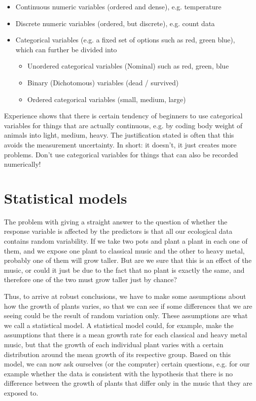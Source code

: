 \documentclass[a4paper,twoside]{tufte-book} %
\begin{document}
\begin{itemize}
\item Continuous numeric variables (ordered and dense), e.g. temperature
\item Discrete numeric variables (ordered, but discrete), e.g. count data
\item Categorical variables (e.g. a fixed set of options such as red, green blue), which can further be divided into
\begin{itemize}
\item Unordered categorical variables (Nominal) such as red, green, blue 
\item Binary (Dichotomous) variables (dead / survived)
\item Ordered categorical variables (small, medium, large)
\end{itemize}
\end{itemize}

Experience shows that there is certain tendency of beginners to use categorical variables for things that are actually continuous, e.g. by coding body weight of animals into light, medium, heavy.  The justification stated is often that this avoids the measurement uncertainty. In short: it doesn't, it just creates more problems. Don't use categorical variables for things that can also be recorded numerically! 


\section{Statistical models}

The problem with giving a straight answer to the question of whether the response variable is affected by the predictors is that all our ecological data contains random variability. If we take two pots and plant a plant in each one of them, and we expose one plant to classical music and the other to heavy metal, probably one of them will grow taller. But are we sure that this is an effect of the music, or could it just be due to the fact that no plant is exactly the same, and therefore one of the two must grow taller just by chance?

Thus, to arrive at robust conclusions, we have to make some assumptions about how the growth of plants varies, so that we can see if some differences that we are seeing could be the result of random variation only. These assumptions are what we call a statistical model.  A statistical model could, for example, make the assumptions that there is a mean growth rate for each classical and heavy metal music, but that the growth of each individual plant varies with a certain distribution around the mean growth of its respective group. Based on this model, we can now ask ourselves (or the computer) certain questions, e.g. for our example whether the data is consistent with the hypothesis that there is no difference between the growth of plants that differ only in the music that they are exposed to.
\end{document}

